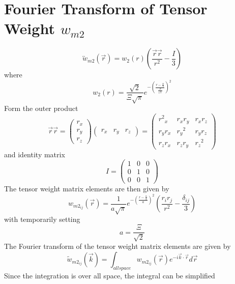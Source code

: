 \documentclass[double,12pt]{beavtex}
\begin{document}
\section{Fourier Transform of Tensor Weight $w_{m2}$}
\begin{equation}{\overleftrightarrow{w}_{m2}(\vec{r})=w_2(r)\left(\frac{\vec{r}\vec{r}}{r^2}-\frac{I}{3}\right)}\end{equation}
where
\begin{equation}{w_2(r)=\frac{\sqrt{2}}{\Xi\sqrt{\pi}}e^{-\left(\frac{r-\frac{\alpha}{2}}{\frac{\Xi}{\sqrt{2}}}\right)^2}}\end{equation}
Form the outer product
\begin{equation}{\vec{r}\vec{r}=\left(\begin{array}{c} r_x \\ r_y \\ r_z \end{array} \right) \left(\begin{array}{rrr} r_x & r_y & r_z \end{array} \right)=\left(\begin{array}{ccc} {r^2}_x & r_xr_y & r_xr_z \\ r_yr_x & {r_y}^2 & r_yr_z \\ r_zr_x & r_zr_y & {r_z}^2 \end{array}\right)}\end{equation}
and identity matrix
\begin{equation}{I=\left(\begin{array}{ccc} 1 & 0 & 0 \\ 0 & 1 & 0 \\ 0 & 0 & 1 \end{array}\right)}\end{equation}
The tensor weight matrix elements are then given by
\begin{equation}{w_{m2_{ij}}(\vec{r})=\frac{1}{a\sqrt{\pi}}e^{-\left(\frac{r-\frac{\alpha}{2}}{a}\right)^2}\left(\frac{r_ir_j}{r^2}-\frac{\delta_{ij}}{3}\right)}\end{equation}
with temporarily setting
\begin{equation}{a=\frac{\Xi}{\sqrt{2}}}\end{equation}
The Fourier transform of the tensor weight matrix elements are given by
\begin{equation}{\widetilde{w}_{m2_{ij}}(\vec{k})=\int_{allspace}{w_{{m2}_{ij}}}(\vec{r})e^{-i\vec{k}\cdot\vec{r}}d{\vec{r}}}\end{equation}
Since the integration is over all space, the integral can be simplified 
\end{document}
